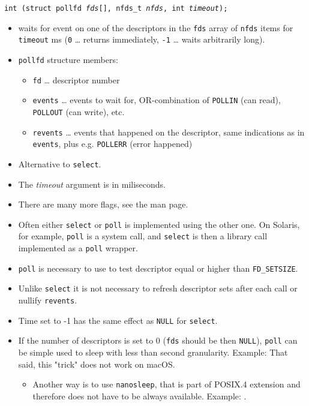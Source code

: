 \begin{slide}
\texttt{int (struct pollfd \emph{fds}[], nfds\_t \emph{nfds},
int \emph{timeout});}
\begin{itemize}
\item waits for event on one of the descriptors in the \texttt{fds} array
of \texttt{nfds} items for \texttt{timeout} ms (\texttt{0}
\dots{} returns immediately, \texttt{-1} \dots{} waits arbitrarily long).
\item \texttt{pollfd} structure members:
    \begin{itemize}
    \item \texttt{fd} \dots{} descriptor number
    \item \texttt{events} \dots{} events to wait for, OR-combination of
    \texttt{POLLIN} (can read), \texttt{POLLOUT} (can write), etc. 
    \item \texttt{revents} \dots{} events that happened on the descriptor,
    same indications as in \texttt{events}, plus e.g. \texttt{POLLERR}
    (error happened)
    \end{itemize}
\end{itemize}
\end{slide}

\label{POLL}

\begin{itemize}
\item Alternative to \texttt{select}.
\item The \emph{timeout} argument is in miliseconds.
\item There are many more flags, see the man page.
\item Often either \texttt{select} or \texttt{poll} is implemented using the
other one.  On Solaris, for example, \texttt{poll} is a system call, and
\texttt{select} is then a library call implemented as a \texttt{poll} wrapper.
\item \texttt{poll} is necessary to use to test descriptor equal or higher than
\texttt{FD\_SETSIZE}. 
\item Unlike \texttt{select} it is not necessary to refresh descriptor sets
after each call or nullify \texttt{revents}.
\item Time set to -1 has the same effect as \texttt{NULL} for \texttt{select}.
\item If the number of descriptors is set to 0 (\texttt{fds} should be then
\texttt{NULL}), \texttt{poll} can be simple used to sleep with less than second
granularity. Example: \label{POLL_SLEEP_C}  That
said, this "trick" does not work on macOS.
\begin{itemize}
\item Another way is to use \texttt{nanosleep}, that is part of POSIX.4
extension and therefore does not have to be always available.
Example: .
\end{itemize}
\end{itemize}

\endinput
